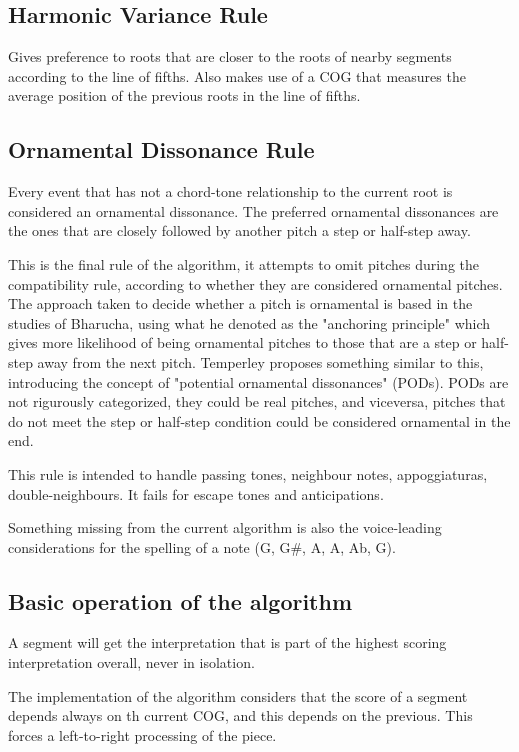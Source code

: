 		\subsection{Harmonic Variance Rule}
		Gives preference to roots that are closer to the roots of nearby segments according to the line of fifths. Also makes use of a COG that measures the average position of the previous roots in the line of fifths.

		\subsection{Ornamental Dissonance Rule}
		Every event that has not a chord-tone relationship to the current root is considered an ornamental dissonance. The preferred ornamental dissonances are the ones that are closely followed by another pitch a step or half-step away.

		This is the final rule of the algorithm, it attempts to omit pitches during the compatibility rule, according to whether they are considered ornamental pitches. The approach taken to decide whether a pitch is ornamental is based in the studies of Bharucha, using what he denoted as the "anchoring principle" which gives more likelihood of being ornamental pitches to those that are a step or half-step away from the next pitch. Temperley proposes something similar to this, introducing the concept of "potential ornamental dissonances" (PODs). PODs are not rigurously categorized, they could be real pitches, and viceversa, pitches that do not meet the step or half-step condition could be considered ornamental in the end.

		This rule is intended to handle passing tones, neighbour notes, appoggiaturas, double-neighbours. It fails for escape tones and anticipations.

		Something missing from the current algorithm is also the voice-leading considerations for the spelling of a note (G, G\#, A, A, Ab, G).

		\subsection{Basic operation of the algorithm}
		A segment will get the interpretation that is part of the highest scoring interpretation overall, never in isolation.

		The implementation of the algorithm considers that the score of a segment depends always on th current COG, and this depends on the previous. This forces a left-to-right processing of the piece.

